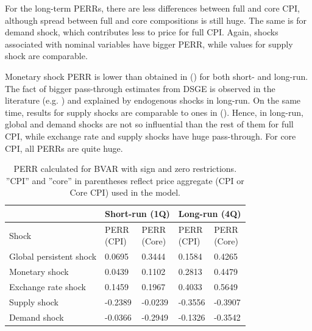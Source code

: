 \documentclass[12pt, a4paper]{extarticle}
\begin{document}
For the long-term PERRs, there are less differences between full and core CPI, although spread between full and core compositions is still huge. The same is for demand shock, which contributes less to price for full CPI. Again, shocks associated with nominal variables have bigger PERR, while values for supply shock are comparable.

Monetary shock PERR is lower than obtained in (\cite[p. 9]{Khotulev2020}) for both short- and long-run. The fact of bigger pass-through estimates from DSGE is observed in the literature (e.g. \cite{Comunale2020}) and explained by endogenous shocks in long-run. On the same time, results for supply shocks are comparable to ones in (\cite{Forbes2018}). Hence, in long-run, global and demand shocks are not so influential than the rest of them for full CPI, while exchange rate and supply shocks have huge pass-through. For core CPI, all PERRs are quite huge. 

\begin{table}[h!!]
	\centering
	\begin{tabular}{@{}lllll@{}}
		\toprule
		& \multicolumn{2}{c}{Short-run (1Q)} & \multicolumn{2}{c}{Long-run (4Q)} \\
		\midrule
		Shock                   & \makecell[c]{PERR\\(CPI)}      & \makecell[c]{PERR\\(Core)}      & \makecell[c]{PERR\\(CPI)}      & \makecell[c]{PERR\\(Core)}     \\
		\midrule
		Global persistent shock & 0.0695          & 0.3444           & 0.1584          & 0.4265          \\
		Monetary shock          & 0.0439          & 0.1102           & 0.2813          & 0.4479          \\
		Exchange rate shock     & 0.1459          & 0.1967           & 0.4033          & 0.5649          \\
		Supply shock            & -0.2389         & -0.0239          & -0.3556         & -0.3907         \\
		Demand shock            & -0.0366         & -0.2949          & -0.1326         & -0.3542   \\
		\bottomrule
	\end{tabular}%
	\caption{PERR calculated for BVAR with sign and zero restrictions. ''CPI'' and ''core'' in parentheses reflect price aggregate (CPI or Core CPI) used in the model.}
	\label{tab:perr}
\end{table}
\end{document}
